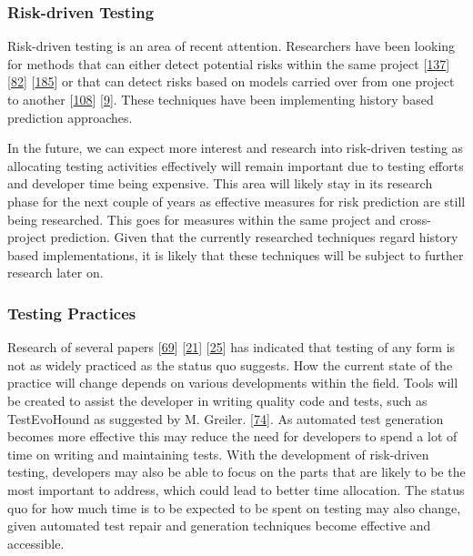 \documentclass[]{book}
\begin{document}
\subsubsection{Risk-driven Testing}\label{risk-driven-testing-1}

Risk-driven testing is an area of recent attention. Researchers have
been looking for methods that can either detect potential risks within
the same project {[}\protect\hyperlink{ref-noor2015test}{137}{]}
{[}\protect\hyperlink{ref-hemmati2018}{82}{]}
{[}\protect\hyperlink{ref-vernotte2015}{185}{]} or that can detect risks
based on models carried over from one project to another
{[}\protect\hyperlink{ref-leung2015testing}{108}{]}
{[}\protect\hyperlink{ref-atifi2017}{9}{]}. These techniques have been
implementing history based prediction approaches.

In the future, we can expect more interest and research into risk-driven
testing as allocating testing activities effectively will remain
important due to testing efforts and developer time being expensive.
This area will likely stay in its research phase for the next couple of
years as effective measures for risk prediction are still being
researched. This goes for measures within the same project and
cross-project prediction. Given that the currently researched techniques
regard history based implementations, it is likely that these techniques
will be subject to further research later on.

\subsubsection{Testing Practices}\label{testing-practices}

Research of several papers
{[}\protect\hyperlink{ref-GAROUSI20131354}{69}{]}
{[}\protect\hyperlink{ref-beller2017developer}{21}{]}
{[}\protect\hyperlink{ref-beller2015}{25}{]} has indicated that testing
of any form is not as widely practiced as the status quo suggests. How
the current state of the practice will change depends on various
developments within the field. Tools will be created to assist the
developer in writing quality code and tests, such as TestEvoHound as
suggested by M. Greiler. {[}\protect\hyperlink{ref-greiler2013}{74}{]}.
As automated test generation becomes more effective this may reduce the
need for developers to spend a lot of time on writing and maintaining
tests. With the development of risk-driven testing, developers may also
be able to focus on the parts that are likely to be the most important
to address, which could lead to better time allocation. The status quo
for how much time is to be expected to be spent on testing may also
change, given automated test repair and generation techniques become
effective and accessible.
\end{document}
